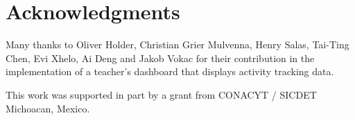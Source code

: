 



\bigskip

\begingroup
\let\clearpage\relax
\let\cleardoublepage\relax
\let\cleardoublepage\relax
\chapter*{Acknowledgments}
Many thanks to Oliver Holder, Christian Grier Mulvenna, Henry Salas, Tai-Ting Chen, Evi Xhelo, Ai Deng and Jakob Vokac for their contribution in the implementation of a teacher's dashboard that displays activity tracking data.

This work was supported in part by a grant from CONACYT / SICDET
Michoacan, Mexico.
\endgroup



